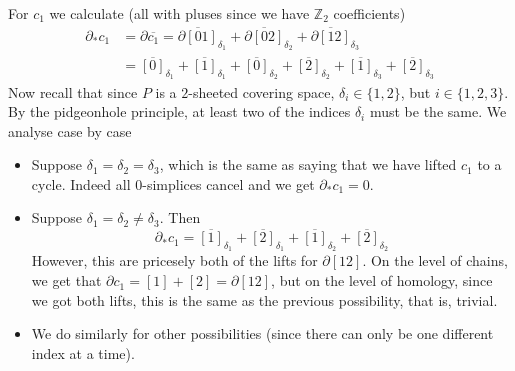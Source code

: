 \documentclass[a4paper, 12pt]{article}
\newcommand{\Z}{\mathbb{Z}}
\begin{document}
\begin{enumerate}
	For $c_1$ we calculate (all with pluses since we have $\Z_2$ coefficients)
	\begin{align*}
	\partial_* c_1 &= \partial\overline{c_1} = \overline{\partial[01]}_{\delta_1} + \overline{\partial[02]}_{\delta_2} + \overline{\partial[12]}_{\delta_3} \\
	&= \overline{[0]}_{\delta_1} + \overline{[1]}_{\delta_1} + \overline{[0]}_{\delta_2} + \overline{[2]}_{\delta_2} + \overline{[1]}_{\delta_3} + \overline{[2]}_{\delta_3}
	\end{align*}
	Now recall that since $P$ is a $2$-sheeted covering space, $\delta_i \in \lbrace 1, 2 \rbrace$, but $i \in \lbrace 1, 2, 3 \rbrace$. By the pidgeonhole principle, at least two of the indices $\delta_i$ must be the same. We analyse case by case
	\begin{itemize}
		\item Suppose $\delta_1 = \delta_2 = \delta_3$, which is the same as saying that we have lifted $c_1$ to a cycle. Indeed all $0$-simplices cancel and we get $\partial_* c_1 = 0$.
		\item Suppose $\delta_1 = \delta_2 \neq \delta_3$. Then
		\[
		\partial_* c_1 = \overline{[1]}_{\delta_1} + \overline{[2]}_{\delta_1} + \overline{[1]}_{\delta_2} + \overline{[2]}_{\delta_2}
		\]
		However, this are pricesely both of the lifts for $\partial [12]$. On the level of chains, we get that $\partial c_1 = [1] + [2] = \partial[12]$, but on the level of homology, since we got both lifts, this is the same as the previous possibility, that is, trivial.
		\item We do similarly for other possibilities (since there can only be one different index at a time).
	\end{itemize}
	 

\end{enumerate}
\end{document}
